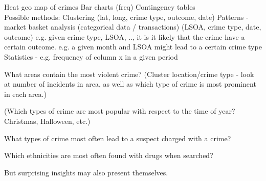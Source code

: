 \documentclass[main.tex]{subfiles}
\begin{document}
Heat geo map of crimes
Bar charts (freq)
Contingency tables
\\

Possible methods:
Clustering (lat, long, crime type, outcome, date)
Patterns - market basket analysis (categorical data / transactions) (LSOA, crime type, date, outcome)
e.g. given crime type, LSOA, .., it is it likely that the crime have a certain outcome. 
e.g. a given month and LSOA might lead to a certain crime type
Statistics - e.g. frequency of column x in a given period

What areas contain the most violent crime?
(Cluster location/crime type - look at number of incidents in area, as well as which type of crime is most prominent in each area.)

(Which types of crime are most popular with respect to the time of year? Christmas, Halloween, etc.)

What types of crime most often lead to a suspect charged with a crime?

Which ethnicities are most often found with drugs when searched?

But surprising insights may also present themselves.
\end{document}
